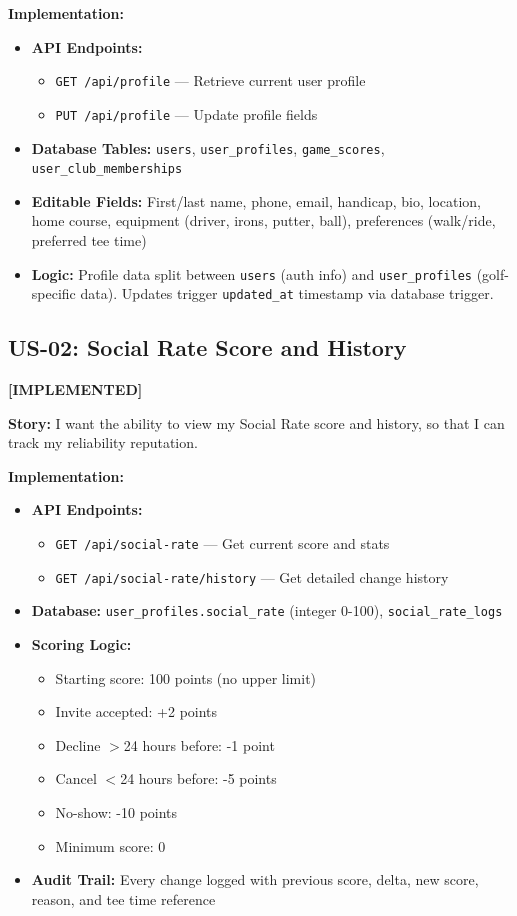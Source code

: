 \documentclass[11pt,a4paper]{article}
\newcommand{\implemented}{\textcolor{implemented}{\textbf{[IMPLEMENTED]}}}
\begin{document}
\textbf{Implementation:}
\begin{itemize}[leftmargin=*]
  \item \textbf{API Endpoints:}
    \begin{itemize}
      \item \texttt{GET /api/profile} --- Retrieve current user profile
      \item \texttt{PUT /api/profile} --- Update profile fields
    \end{itemize}
  \item \textbf{Database Tables:} \texttt{users}, \texttt{user\_profiles}, \texttt{game\_scores}, \texttt{user\_club\_memberships}
  \item \textbf{Editable Fields:} First/last name, phone, email, handicap, bio, location, home course, equipment (driver, irons, putter, ball), preferences (walk/ride, preferred tee time)
  \item \textbf{Logic:} Profile data split between \texttt{users} (auth info) and \texttt{user\_profiles} (golf-specific data). Updates trigger \texttt{updated\_at} timestamp via database trigger.
\end{itemize}

\subsection{US-02: Social Rate Score and History}
\implemented

\textbf{Story:} I want the ability to view my Social Rate score and history, so that I can track my reliability reputation.

\textbf{Implementation:}
\begin{itemize}[leftmargin=*]
  \item \textbf{API Endpoints:}
    \begin{itemize}
      \item \texttt{GET /api/social-rate} --- Get current score and stats
      \item \texttt{GET /api/social-rate/history} --- Get detailed change history
    \end{itemize}
  \item \textbf{Database:} \texttt{user\_profiles.social\_rate} (integer 0-100), \texttt{social\_rate\_logs}
  \item \textbf{Scoring Logic:}
    \begin{itemize}
      \item Starting score: 100 points (no upper limit)
      \item Invite accepted: +2 points
      \item Decline $>$24 hours before: -1 point
      \item Cancel $<$24 hours before: -5 points
      \item No-show: -10 points
      \item Minimum score: 0
    \end{itemize}
  \item \textbf{Audit Trail:} Every change logged with previous score, delta, new score, reason, and tee time reference
\end{itemize}
\end{document}
